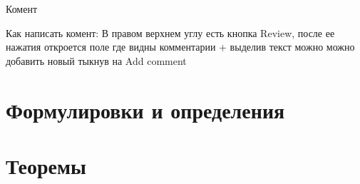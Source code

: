 \documentclass[12pt, a4paper]{article}
\begin{document}
Комент

\noindent Как написать комент: В правом верхнем углу есть кнопка Review, после ее нажатия откроется поле где видны комментарии + выделив текст можно можно добавить новый тыкнув на Add comment
\newpage
\section{Формулировки и определения}
\setcounter{subsection}{2}











\newpage
\section{Теоремы}
\setcounter{subsection}{2}














\end{document}
